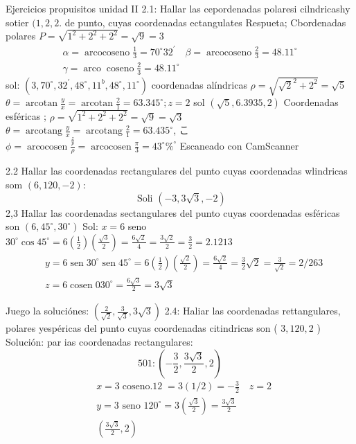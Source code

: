 



Ejercicios propuisitos unidad II
2.1: Hallar las cepordenadas polaresi cilndricashy sotier $(1,2,2$. de punto, cuyas coordenadas ectangulates
Respueta;
Cbordenadas polares $P=\sqrt{1^2+2^2+2^2}=\sqrt{9}=3$
$$
\begin{gathered}
	\alpha=\operatorname{arcocoseno} \frac{1}{3}=70^{\circ} 32^{\prime} \quad \beta=\operatorname{arcocoseno} \frac{2}{3}=48.11^{\circ} \\
	\gamma=\operatorname{arco} \operatorname{coseno} \frac{2}{3}=48.11^{\circ}
\end{gathered}
$$
sol: $\left(3,70^{\circ}, 32^{\prime}, 48^{\circ}, 11^b, 48^{\circ}, 11^{\circ}\right)$
coordenadas alíndricas $\rho=\sqrt{\sqrt{2}^2+2^2}=\sqrt{5}$
$\theta=\operatorname{arcotan} \frac{y}{x}=\operatorname{arcotan} \frac{2}{1}=63.345^{\circ} ; z=2$ sol $(\sqrt{5}, 6.3935,2)$
Coordenadas esféricas ; $\rho=\sqrt{1^2+2^2+2^2}=\sqrt{9}=\sqrt{3}$
$\theta=\operatorname{arcotang} \frac{y}{x}=\operatorname{arcotang} \frac{2}{1}=63.435^{\circ}$,
こ $\phi=\operatorname{arcocosen} \frac{\frac{z}{p}}{\rho}=\operatorname{arcocosen} \frac{\pi}{3}=43^{\circ} \%^{\circ}$
Escaneado con CamScanner




2.2 Hallar las coordenadas rectangulares del punto cuyas coordenadas wlindricas som $(6,120,-2):$
$$
\text { Soli }(-3,3 \sqrt{3},-2)
$$
2,3 Hallar las coordenadas sectangulares del punto cuyas coordenadas esféricas son $\left(6,45^{\circ}, 30^{\circ}\right)$
Sol: $x=6$ seno $30^{\circ} \cos 45^{\circ}=6\left(\frac{1}{2}\right)\left(\frac{\sqrt{3}}{2}\right)=\frac{6 \sqrt{2}}{4}=\frac{3 \sqrt{2}}{2}=\frac{3}{2}=2.1213$
$$
\begin{aligned}
	& y=6 \operatorname{sen} 30^{\circ} \operatorname{sen} 45^{\circ}=6\left(\frac{1}{2}\right)\left(\frac{\sqrt{2}}{2}\right)=\frac{6 \sqrt{2}}{4}=\frac{3}{2} \sqrt{2}=\frac{3}{\sqrt{2}}=2 / 263 \\
	& z=6 \operatorname{cosen} 030^{\circ}=\frac{6 \sqrt{3}}{2}=3 \sqrt{3}
\end{aligned}
$$

Juego la soluciónes: $\left(\frac{2}{\sqrt{2}}, \frac{3}{\sqrt{3}}, 3 \sqrt{3}\right)$
2.4: Haliar las coordenadas rettangulares, polares yespéricas del punto cuyas coordenadas citindricas son ( $3,120,2$ )
Solución: par ias coordenadas rectangulares:
$$
501:\left(-\frac{3}{2}, \frac{3 \sqrt{3}}{2}, 2\right)
$$
$$
\begin{aligned}
	& x=3 \operatorname{coseno.12}=3(1 / 2)=-\frac{3}{2} \quad z=2 \\
	& y=3 \text { seno } 120^{\circ}=3\left(\frac{\sqrt{3}}{2}\right)=\frac{3 \sqrt{3}}{2} \\
	& \left(\frac{3 \sqrt{3}}{2}, 2\right)
\end{aligned}
$$

